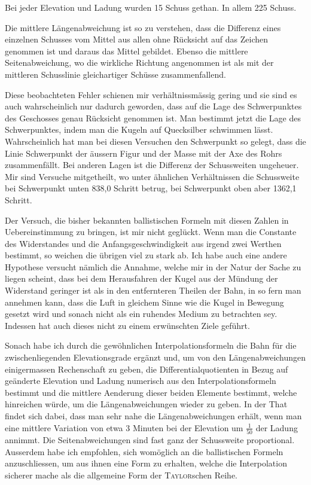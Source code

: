 \begingroup\renewcommand{\thefootnote}{}\endgroup
{}
\clearpage{}
\noindent Bei jeder Elevation und Ladung wurden 15 Schuss gethan. In allem 225
Schuss.

Die mittlere Längenabweichung ist so zu verstehen, dass die Differenz
eines einzelnen Schusses vom Mittel aus allen ohne Rücksicht auf das Zeichen
genommen ist und daraus das Mittel gebildet. Ebenso die mittlere Seitenabweichung,
wo die wirkliche Richtung angenommen ist als mit der mittleren
Schusslinie gleichartiger Schüsse zusammenfallend.

Diese beobachteten Fehler schienen mir verhältnissmässig gering und sie
sind es auch wahrscheinlich nur dadurch geworden, dass auf die Lage des
Schwerpunktes des Geschosses genau Rücksicht genommen ist. Man bestimmt
jetzt die Lage des Schwerpunktes, indem man die Kugeln auf Quecksilber
schwimmen lässt. Wahrscheinlich hat man bei diesen Versuchen den Schwerpunkt
so gelegt, dass die Linie Schwerpunkt der äussern Figur und der
Masse mit der Axe des Rohrs zusammenfällt. Bei anderen Lagen ist die
Differenz der Schussweiten ungeheuer. Mir sind Versuche mitgetheilt, wo
unter ähnlichen Verhältnissen die Schussweite bei Schwerpunkt unten 838,0
Schritt betrug, bei Schwerpunkt oben aber 1362,1 Schritt.

Der Versuch, die bisher bekannten ballistischen Formeln mit diesen
Zahlen in Uebereinstimmung zu bringen, ist mir nicht geglückt. Wenn man
die Constante des Widerstandes und die Anfangsgeschwindigkeit aus irgend
zwei Werthen bestimmt, so weichen die übrigen viel zu stark ab. Ich habe
auch eine andere Hypothese versucht nämlich die Annahme, welche mir in
der Natur der Sache zu liegen scheint, dass bei dem Herausfahren der
Kugel aus der Mündung der Widerstand geringer ist als in den entfernteren
Theilen der Bahn, in so fern man annehmen kann, dass die Luft in gleichem
Sinne wie die Kugel in Bewegung gesetzt wird und sonach nicht als ein
ruhendes Medium zu betrachten sey. Indessen hat auch dieses nicht zu einem
erwünschten Ziele geführt.

Sonach habe ich durch die gewöhnlichen Interpolationsformeln die Bahn
für die zwischenliegenden Elevationsgrade ergänzt und, um von den Längenabweichungen
einigermassen Rechenschaft zu geben, die Differentialquotienten
in Bezug auf geänderte Elevation und Ladung numerisch aus den Interpolationsformeln
bestimmt und die mittlere Aenderung dieser beiden Elemente bestimmt,
welche hinreichen würde, um die Längenabweichungen wieder zu geben. In der
\clearpage{}
\noindent That findet sich dabei, dass man sehr nahe die Längenabweichungen erhält,
wenn man eine mittlere Variation von etwa 3 Minuten bei der Elevation um
\(\frac1{50}\) der Ladung annimmt. Die Seitenabweichungen sind fast ganz der Schussweite
proportional. Ausserdem habe ich empfohlen, sich womöglich an die
ballistischen Formeln anzuschliessen, um aus ihnen eine Form zu erhalten,
welche die Interpolation sicherer mache als die allgemeine Form der \textsc{Taylor}schen
Reihe.

